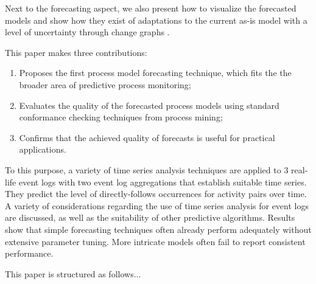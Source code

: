Next to the forecasting aspect, we also present how to visualize the forecasted models and show how they exist of adaptations to the current as-is model with a level of uncertainty through change graphs \cite{DBLP:conf/er/KabicherKR11}.

This paper makes three contributions:
\begin{enumerate}
	\item Proposes the first process model forecasting technique, which fits the the broader area of predictive process monitoring;
	\item Evaluates the quality of the forecasted process models using standard conformance checking techniques from process mining;
	\item Confirms that the achieved quality of forecasts is useful for practical applications.
\end{enumerate}

To this purpose, a variety of time series analysis techniques are applied to 3 real-life event logs with two event log aggregations that establish suitable time series. They predict the level of directly-follows occurrences for activity pairs over time.
A variety of considerations regarding the use of time series analysis for event logs are discussed, as well as the suitability of other predictive algorithms.
Results show that simple forecasting techniques often already perform adequately without extensive parameter tuning. More intricate models often fail to report consistent performance.

This paper is structured as follows...
